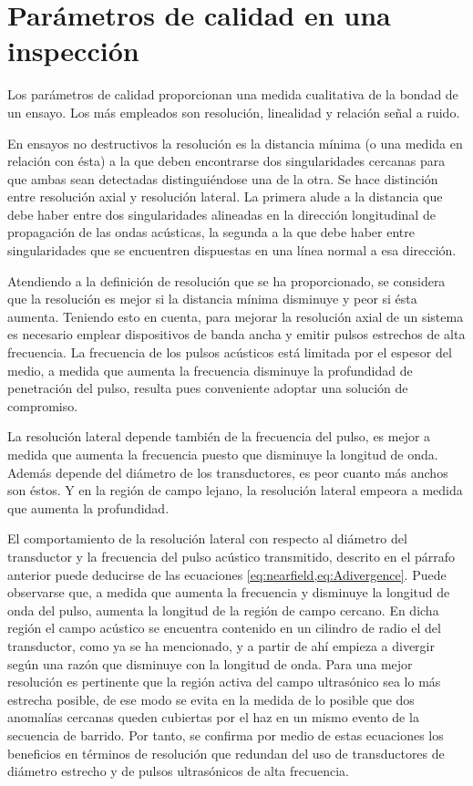 \section{Parámetros de calidad en una inspección}\label{sec:quality}

Los parámetros de calidad proporcionan una medida cualitativa de la bondad
de un ensayo. Los más empleados son resolución, linealidad y relación señal
a ruido.

En ensayos no destructivos la resolución es la distancia mínima (o una
medida en relación con ésta) a la que deben encontrarse dos singularidades
cercanas para que ambas sean detectadas distinguiéndose una de la otra. Se
hace distinción entre resolución axial y resolución lateral. La primera
alude a la distancia que debe haber entre dos singularidades alineadas en
la dirección longitudinal de propagación de las ondas acústicas, la segunda
a la que debe haber entre singularidades que se encuentren dispuestas en
una línea normal a esa dirección.

Atendiendo a la definición de resolución que se ha proporcionado, se
considera que la resolución es mejor si la distancia mínima disminuye y
peor si ésta aumenta. Teniendo esto en cuenta, para mejorar la resolución
axial de un sistema es necesario emplear dispositivos de banda ancha y
emitir pulsos estrechos de alta frecuencia. La frecuencia de los pulsos
acústicos está limitada por el espesor del medio, a medida que aumenta la
frecuencia disminuye la profundidad de penetración del pulso, resulta pues
conveniente adoptar una solución de compromiso.

La resolución lateral depende también de la frecuencia del pulso, es mejor
a medida que aumenta la frecuencia puesto que disminuye la longitud de
onda. Además depende del diámetro de los transductores, es peor cuanto más
anchos son éstos. Y en la región de campo lejano, la resolución lateral
empeora a medida que aumenta la profundidad.

El comportamiento de la resolución lateral con respecto al diámetro del
transductor y la frecuencia del pulso acústico transmitido, descrito en el
párrafo anterior puede deducirse de las ecuaciones
\cref{eq:nearfield,eq:Adivergence}. Puede observarse que, a medida que
aumenta la frecuencia y disminuye la longitud de onda del pulso, aumenta la
longitud de la región de campo cercano. En dicha región el campo acústico
se encuentra contenido en un cilindro de radio el del transductor, como ya
se ha mencionado, y a partir de ahí empieza a divergir según una razón que
disminuye con la longitud de onda. Para una mejor resolución es pertinente
que la región activa del campo ultrasónico sea lo más estrecha posible, de
ese modo se evita en la medida de lo posible que dos anomalías cercanas
queden cubiertas por el haz en un mismo evento de la secuencia de barrido.
Por tanto, se confirma por medio de estas ecuaciones los beneficios en
términos de resolución que redundan del uso de transductores de diámetro
estrecho y de pulsos ultrasónicos de alta frecuencia.

